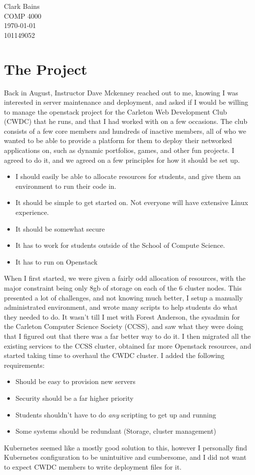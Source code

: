 \documentclass{article}
\begin{document}
\begin{center}
    {\Large Clark Bains}\\
    COMP 4000 \\
    \today \\
    101149052
\end{center}
\section{The Project}
Back in August, Instructor Dave Mckenney reached out to me, knowing I was interested in server maintenance and deployment, and asked if I would be willing to manage the openstack project for the Carleton Web Development Club (CWDC) that he runs, and that I had worked with on a few occasions. The club consists of a few core members and hundreds of inactive members, all of who we wanted to be able to provide a platform for them to deploy their networked applications on, such as dynamic portfolios, games, and other fun projects. I agreed to do it, and we agreed on a few principles for how it should be set up.
\begin{itemize}
    \item I should easily be able to allocate resources for students, and give them an environment to run their code in.
    \item It should be simple to get started on. Not everyone will have extensive Linux experience.
    \item It should be somewhat secure
    \item It has to work for students outside of the School of Compute Science.
    \item It has to run on Openstack
\end{itemize}
When I first started, we were given a fairly odd allocation of resources, with the major constraint being only 8gb of storage on each of the 6 cluster nodes. This presented a lot of challenges, and not knowing much better, I setup a manually administrated environment, and wrote many scripts to help students do what they needed to do. It wasn't till I met with Forest Anderson, the sysadmin for the Carleton Computer Science Society (CCSS), and saw what they were doing that I figured out that there was a far better way to do it. I then migrated all the existing services to the CCSS cluster, obtained far more Openstack resources, and started taking time to overhaul the CWDC cluster. I added the following requirements:
\begin{itemize}
    \item Should be easy to provision new servers
    \item Security should be a far higher priority
    \item Students shouldn't have to do \emph{any} scripting to get up and running
    \item Some systems should be redundant (Storage, cluster management)
\end{itemize}
Kubernetes seemed like a mostly good solution to this, however I personally find Kubernetes configuration to be unintuitive and cumbersome, and I did not want to expect CWDC members to write deployment files for it.
\end{document}
